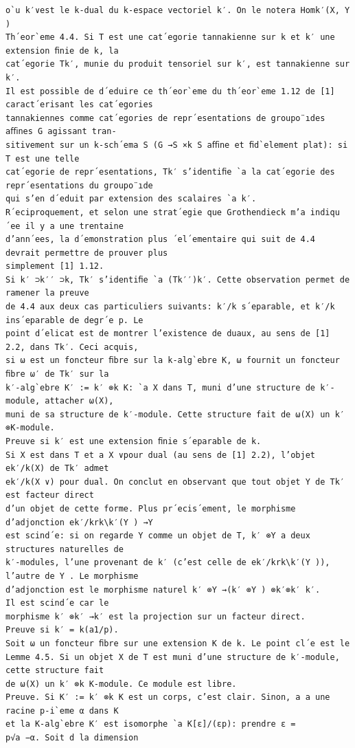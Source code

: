 \documentclass[10pt]{article}
\begin{document}
\begin{verbatim}
o`u k′∨est le k-dual du k-espace vectoriel k′. On le notera Homk′(X, Y )
Th´eor`eme 4.4. Si T est une cat´egorie tannakienne sur k et k′ une extension ﬁnie de k, la
cat´egorie Tk′, munie du produit tensoriel sur k′, est tannakienne sur k′.
Il est possible de d´eduire ce th´eor`eme du th´eor`eme 1.12 de [1] caract´erisant les cat´egories
tannakiennes comme cat´egories de repr´esentations de groupo¨ıdes aﬃnes G agissant tran-
sitivement sur un k-sch´ema S (G →S ×k S aﬃne et ﬁd`element plat): si T est une telle
cat´egorie de repr´esentations, Tk′ s’identiﬁe `a la cat´egorie des repr´esentations du groupo¨ıde
qui s’en d´eduit par extension des scalaires `a k′.
R´eciproquement, et selon une strat´egie que Grothendieck m’a indiqu´ee il y a une trentaine
d’ann´ees, la d´emonstration plus ´el´ementaire qui suit de 4.4 devrait permettre de prouver plus
simplement [1] 1.12.
Si k′ ⊃k′′ ⊃k, Tk′ s’identiﬁe `a (Tk′′)k′. Cette observation permet de ramener la preuve
de 4.4 aux deux cas particuliers suivants: k′/k s´eparable, et k′/k ins´eparable de degr´e p. Le
point d´elicat est de montrer l’existence de duaux, au sens de [1] 2.2, dans Tk′. Ceci acquis,
si ω est un foncteur ﬁbre sur la k-alg`ebre K, ω fournit un foncteur ﬁbre ω′ de Tk′ sur la
k′-alg`ebre K′ := k′ ⊗k K: `a X dans T, muni d’une structure de k′-module, attacher ω(X),
muni de sa structure de k′-module. Cette structure fait de ω(X) un k′ ⊗K-module.
Preuve si k′ est une extension ﬁnie s´eparable de k.
Si X est dans T et a X ∨pour dual (au sens de [1] 2.2), l’objet ek′/k(X) de Tk′ admet
ek′/k(X ∨) pour dual. On conclut en observant que tout objet Y de Tk′ est facteur direct
d’un objet de cette forme. Plus pr´ecis´ement, le morphisme d’adjonction ek′/krk\k′(Y ) →Y
est scind´e: si on regarde Y comme un objet de T, k′ ⊗Y a deux structures naturelles de
k′-modules, l’une provenant de k′ (c’est celle de ek′/krk\k′(Y )), l’autre de Y . Le morphisme
d’adjonction est le morphisme naturel k′ ⊗Y →(k′ ⊗Y ) ⊗k′⊗k′ k′.
Il est scind´e car le
morphisme k′ ⊗k′ →k′ est la projection sur un facteur direct.
Preuve si k′ = k(a1/p).
Soit ω un foncteur ﬁbre sur une extension K de k. Le point cl´e est le
Lemme 4.5. Si un objet X de T est muni d’une structure de k′-module, cette structure fait
de ω(X) un k′ ⊗k K-module. Ce module est libre.
Preuve. Si K′ := k′ ⊗k K est un corps, c’est clair. Sinon, a a une racine p-i`eme α dans K
et la K-alg`ebre K′ est isomorphe `a K[ε]/(εp): prendre ε =
p√a −α. Soit d la dimension


\end{verbatim}
\end{document}
